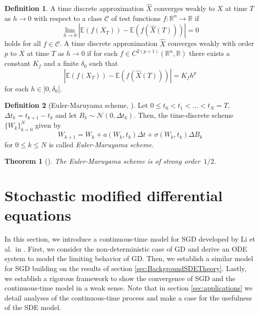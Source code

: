\documentclass[12pt]{article}
\newtheorem{theorem}{Theorem}[section]
\theoremstyle{definition}
\newtheorem{definition}[definition]{Definition}
\numberwithin{equation}{section}
\newcommand{\R}{\mathbb{R}}
\newcommand{\CN}{\mathcal{N}}
\begin{document}
\begin{definition}
  A time discrete approximation $\widehat{X}$ converges weakly to $X$ at time $T$ as $h \rightarrow 0$ with respect to a class $\mathcal{C}$ of test functions $f: \R^n \rightarrow \R$ if 
  \begin{equation}
    \lim_{h \rightarrow 0} |\mathbb{E}(f(X_T)) - \mathbb{E}(f(\widehat{X}(T)))| = 0
  \end{equation}
  holds for all $f \in \mathcal{C}$.
  A time discrete approximation $\widehat{X}$ converges weakly with order $p$ to $X$ at time $T$ as $h \rightarrow 0$ if for each $f \in C^{2(p+1)}(\R^n, \R)$ there exists a constant $K_f$ and a finite $\delta_0$ such that 
  \begin{equation}
     |\mathbb{E}(f(X_T)) - \mathbb{E}(f(\widehat{X}(T)))| = K_f h^p
  \end{equation}
  for each $h \in ]0, \delta_0[$.
\end{definition}
\begin{definition}[Euler-Maruyama scheme, ]
  Let $0 \leq t_0 < t_1 < \dots < t_N = T$, $\Delta t_k = t_{k+1} - t_k$ and let $B_k \sim \CN(0,\Delta t_k)$. Then, the time-discrete scheme $\{W_k\}_{k=0}^N$ given by
\begin{equation}
  \label{eq:euler_maruyama}
  W_{k+1} = W_k + a(W_k, t_k)\Delta t + \sigma(W_k, t_k) \Delta B_k
\end{equation}
for $0 \leq k \leq N$ is called \emph{Euler-Maruyama scheme}.
\end{definition}

\begin{theorem}[]
  The Euler-Maruyama scheme is of strong order~$1/2$.
\end{theorem}
\section{Stochastic modified differential equations}
\label{sec:sde_model}
In this section, we introduce a continuous-time model for SGD developed by Li et al.\ in \cite{liStochasticModifiedEquations2017}. First, we consider the non-deterministic case of GD and derive an ODE system to model the limiting behavior of GD. Then, we establish a similar model for SGD building on the results of section \autoref{sec:BackgroundSDETheory}. Lastly, we establish a rigorous framework to show the convergence of SGD and the continuous-time model in a weak sense.
Note that in section \autoref{sec:applications} we detail analyses of the continuous-time process and make a case for the usefulness of the SDE model.
\end{document}
